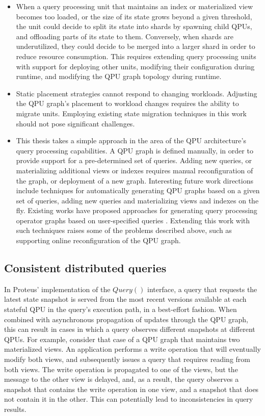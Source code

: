 \begin{itemize}
  \item When a query processing unit that maintains an index or materialized view becomes too loaded,
  or the size of its state grows beyond a given threshold,
  the unit could decide to split its state into shards by spawning child QPUs,
  and offloading parts of its state to them.
  Conversely, when shards are underutilized, they could decide to be merged into a larger shard in order
  to reduce resource consumption.
  This requires extending query processing units with support for deploying other units,
  modifying their configuration during runtime, and modifying the QPU graph topology during runtime.

  \item Static placement strategies cannot respond to changing workloads.
  Adjusting the QPU graph's placement to workload changes requires the ability to migrate units.
  Employing existing state migration techniques in this work should not pose significant challenges.

  \item This thesis takes a simple approach in the area of the QPU architecture's query processing capabilities.
  A QPU graph is defined manually, in order to provide support for a pre-determined set of queries.
  Adding new queries, or materializing additional views or indexes requires manual reconfiguration of the graph,
  or deployment of a new graph.
  Interesting future work directions include techniques for automatically generating QPU graphs based on a
  given set of queries,
  adding new queries and materializing views and indexes on the fly.
  Existing works have proposed approaches for generating query processing operator graphs based on user-specified queries
  \cite{gjengset:noria, kate:pequod}.
  Extending this work with such techniques raises some of the problems described above, such as supporting online
  reconfiguration of the QPU graph.

\end{itemize}

\subsection{Consistent distributed queries}

In Proteus' implementation of the $Query()$ interface,
a query that requests the latest state snapshot is served from the most recent versions available at each stateful QPU
in the query's execution path, in a best-effort fashion.
When combined with asynchronous propagation of updates through the QPU graph,
this can result in cases in which a query observes different snapshots at different QPUs.
For example, consider that case of a QPU graph that maintains two materialized views.
An application performs a write operation that will eventually modify both views,
and subsequently issues a query that requires reading from both views.
The write operation is propagated to one of the views, but the message to the other view is delayed,
and, as a result, the query observes a snapshot that contains the write operation in one view,
and a snapshot that does not contain it in the other.
This can potentially lead to inconsistencies in query results.

